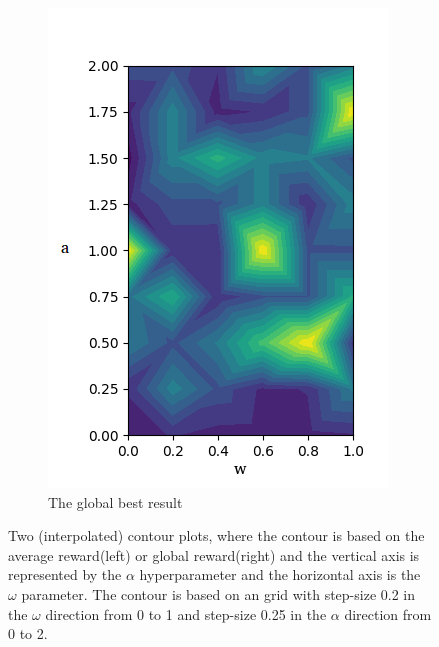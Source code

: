 \documentclass[]{article}
\begin{document}
\begin{figure}[h]
\begin{subfigure}[b]{0.4\textwidth}
        \includegraphics[width=\textwidth]{images/200_gl_results_best.png}
        \caption{The global best result}
        \label{fig:global best}
    \end{subfigure}
    \caption{Two (interpolated) contour plots, where the contour is based on the average reward(left) or global reward(right) and the vertical axis is represented by the $\alpha$ hyperparameter and the horizontal axis is the $\omega$ parameter. The contour is based on an grid with step-size 0.2 in the $\omega$ direction from 0 to 1 and step-size 0.25 in the $\alpha$ direction from 0 to 2.}
    \label{fig:gridsearch}
\end{figure}
\end{document}
